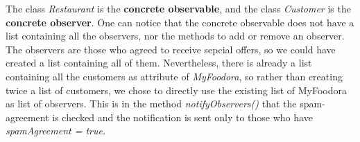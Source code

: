 The class \textit{Restaurant} is the \textbf{concrete observable}, and the class \textit{Customer} is the \textbf{concrete observer}. One can notice that the concrete observable does not have a list containing all the observers, nor the methods to add or remove an observer. The observers are those who agreed to receive sepcial offers, so we could have created a list containing all of them. Nevertheless, there is already a list containing all the customers as attribute of \textit{MyFoodora}, so rather than creating twice a list of customers, we chose to directly use the existing list of MyFoodora as list of observers. This is in the method \textit{notifyObservers()} that the spam-agreement is checked and the notification is sent only to those who have \textit{spamAgreement = true}.

